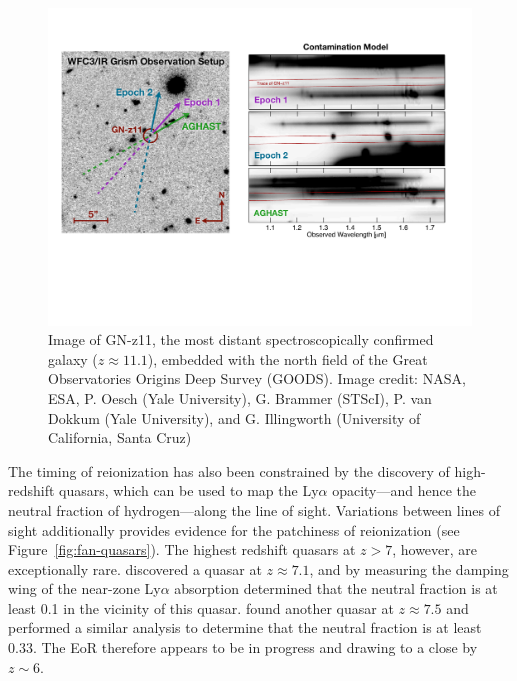 \begin{bibunit}
\begin{figure}[t]
    \centering
    \includegraphics[width=\textwidth]{figures/chapter1/oesch-gn-z11}
    \caption{
        Image of GN-z11, the most distant spectroscopically confirmed galaxy ($z\approx11.1$),
        embedded with the north field of the Great Observatories Origins Deep Survey (GOODS).  Image
        credit: NASA, ESA, P. Oesch (Yale University), G. Brammer (STScI), P. van Dokkum (Yale
        University), and G. Illingworth (University of California, Santa Cruz)
    }
    \label{fig:oesch-galaxy}
\end{figure}

The timing of reionization has also been constrained by the discovery of high-redshift quasars,
which can be used to map the Ly$\alpha$ opacity---and hence the neutral fraction of hydrogen---along
the line of sight.  Variations between lines of sight additionally provides evidence for the
patchiness of reionization (see Figure~\ref{fig:fan-quasars}). The highest redshift quasars at
$z>7$, however, are exceptionally rare.  \citet{2011Natur.474..616M} discovered a quasar at
$z\approx7.1$, and by measuring the damping wing of the near-zone Ly$\alpha$ absorption determined
that the neutral fraction is at least 0.1 in the vicinity of this quasar.
\citet{2018Natur.553..473B} found another quasar at $z\approx7.5$ and performed a similar analysis
to determine that the neutral fraction is at least 0.33. The EoR therefore appears to be in progress
and drawing to a close by $z\sim 6$.


\end{bibunit}
